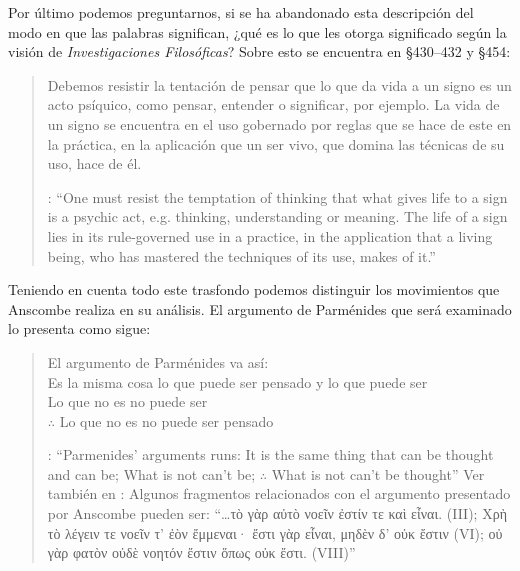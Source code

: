 Por último podemos preguntarnos, si se ha abandonado esta descripción del modo en que las palabras significan, ¿qué es lo que les otorga significado según la visión de \emph{Investigaciones Filosóficas}? Sobre esto se encuentra en \S430--432 y \S454: \blockquote[{\cite[4]{hacker2000mind}}: \enquote{One must resist the temptation of thinking that what gives life to a sign is a psychic act, e.g. thinking, understanding or meaning. The life of a sign lies in its rule-governed use in a practice, in the application that a living being, who has mastered the techniques of its use, makes of it.}]{Debemos resistir la tentación de pensar que lo que da vida a un signo es un acto psíquico, como pensar, entender o significar, por ejemplo. La vida de un signo se encuentra en el uso gobernado por reglas que se hace de este en la práctica, en la aplicación que un ser vivo, que domina las técnicas de su uso, hace de él.}

Teniendo en cuenta todo este trasfondo podemos distinguir los movimientos que Anscombe realiza en su análisis. El argumento de Parménides que será examinado lo presenta como sigue: \blockquote[{\cite[3]{anscombe1981parmenides:pmc}}: \enquote{Parmenides' arguments runs: It is the same thing that can be thought and can be; What is not can't be; $\therefore$ What is not can't be thought} Ver también en {\cite[22--25]{parmenides2007poema}}: Algunos fragmentos relacionados con el argumento presentado por Anscombe pueden ser: \enquote{\ldots\textgreek{τὸ γὰρ αὐτὸ νοεῖν ἐστίν τε καὶ εἶναι.} (III); \textgreek{Χρὴ τὸ λέγειν τε νοεῖν τ' ἐὸν ἔμμεναι· ἔστι γὰρ εἶναι, μηδὲν δ' οὐκ ἔστιν} (VI); \textelp{} \textgreek{οὐ γὰρ φατὸν οὐδὲ νοητόν ἔστιν ὅπως οὐκ ἔστι.} (VIII)}]{El argumento de Parménides va así:\\
Es la misma cosa lo que puede ser pensado y lo que puede ser\\
Lo que no es no puede ser\\
$\therefore$ Lo que no es no puede ser pensado}

